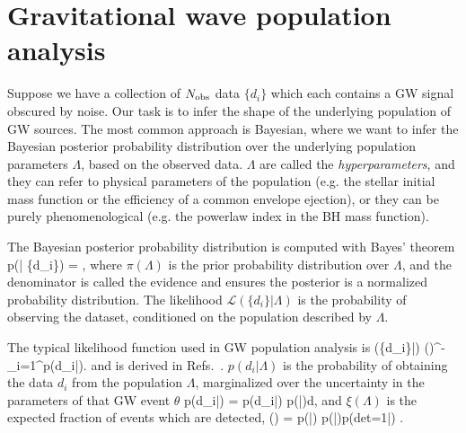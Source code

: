 \documentclass[%
 reprint,
 amsmath,amssymb,
 aps,nofootinbib,nobibnotes,onecolumn,prd
]{revtex4-2}
\begin{document}
\section{Gravitational wave population analysis}
\label{sec: mc population analysis}

Suppose we have a collection of $N_{\rm obs}$ data $\{d_i\}$ which each contains a \ac{GW} signal obscured by noise. Our task is to infer the shape of the underlying population of \ac{GW} sources. The most common approach is Bayesian, where we want to infer the Bayesian posterior probability distribution over the underlying population parameters $\Lambda$, based on the observed data. $\Lambda$ are called the \textit{hyperparameters}, and they can refer to physical parameters of the population (e.g. the stellar initial mass function or the efficiency of a common envelope ejection), or they can be purely phenomenological (e.g. the powerlaw index in the \ac{BH} mass function). 

The Bayesian posterior probability distribution is computed with Bayes' theorem
\beq
p(\Lambda | \{d_i\}) = ,
\label{eq: Bayes theorem}
\eeq
where $\pi(\Lambda)$ is the prior probability distribution over $\Lambda$, and the denominator is called the evidence and ensures the posterior is a normalized probability distribution. The likelihood $\mathcal{L}(\{d_i\} | \Lambda)$ is the probability of observing the dataset, conditioned on the population described by $\Lambda$.

The typical likelihood function used in \ac{GW} population analysis is 
\beq
{}(\{d_i\}|\Lambda) \propto \xi(\Lambda)^{-\Nobs}\prod_{i=1}^{\Nobs}p(d_i|\Lambda).
\label{eq: rate marginalized likelihood}
\eeq
and is derived in Refs.~\citep{Farr:2013yna,Mandel:2018mve,Vitale2020,Essick:2023upv}.
$p(d_i|\Lambda)$ is the probability of obtaining the data $d_i$ from the population $\Lambda$, marginalized over the uncertainty in the parameters of that \ac{GW} event $\theta$
\beq
p(d_i|\Lambda) = \int p(d_i|\theta) p(\theta|\Lambda)d\theta,
\label{eq: single event integral}
\eeq
and $\xi(\Lambda)$ is the expected fraction of events which are detected,
\beq
\xi(\Lambda) = \int p(\theta|\Lambda) p(|\theta)p({\rm det}=1|) \dd\theta \dd{}.
\label{eq: selection efficiency}
\eeq
\end{document}
